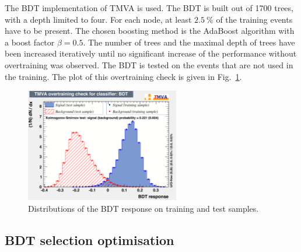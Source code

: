 The BDT implementation of TMVA \cite{hocker:2007ht} is used. The BDT is built
out of 1700 trees, with a depth limited to four. For each node, at least
$\SI{2.5}{\percent}$ of the training events have to be present. The chosen boosting method is the
AdaBoost \cite{AdaBoost} algorithm with a boost factor $\beta=\num{0.5}$. 
The number of trees and the maximal depth of trees have been increased
iteratively until no significant increase of the performance without overtraining was observed.
The BDT is tested on the events that are not used in the training. The plot of
this overtraining check is given in Fig.~\ref{fig:BDTovertraining}.
\begin{figure}[t]
	\begin{center}
		\includegraphics[width=0.6\textwidth]{02Selection/figs/overtrain_BDT.pdf}
	\end{center}
        \vspace{-2mm}
	\caption{Distributions of the BDT response on training and test samples.}
	\label{fig:BDTovertraining}
\end{figure}

\subsection{BDT selection optimisation}
\label{sec:BDToptimisation}

